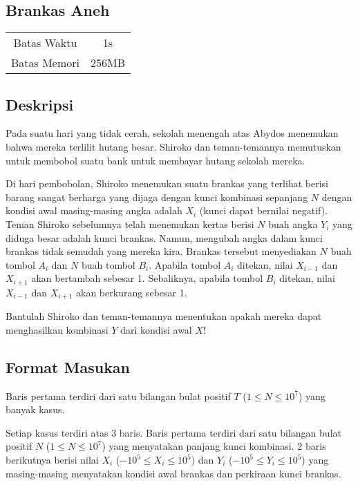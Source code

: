 \documentclass{article}
\begin{document}
\begin{center}

    
    \section*{Brankas Aneh} %

    \begin{tabular}{ | c c | }
        \hline
        Batas Waktu  & 1s \\    %
        Batas Memori & 256MB \\  %
        \hline
    \end{tabular}
\end{center}

\subsection*{Deskripsi}

Pada suatu hari yang tidak cerah, sekolah menengah atas Abydos menemukan bahwa mereka terlilit hutang besar. Shiroko dan teman-temannya memutuskan untuk membobol suatu bank untuk membayar hutang sekolah mereka.

Di hari pembobolan, Shiroko menemukan suatu brankas yang terlihat berisi barang sangat berharga yang dijaga dengan kunci kombinasi sepanjang $N$ dengan kondisi awal masing-masing angka adalah $X_i$ (kunci dapat bernilai negatif). Teman Shiroko sebelumnya telah menemukan kertas berisi $N$ buah angka $Y_i$ yang diduga besar adalah kunci brankas. Namun, mengubah angka dalam kunci brankas tidak semudah yang mereka kira. Brankas tersebut menyediakan $N$ buah tombol $A_i$ dan $N$ buah tombol $B_i$. Apabila tombol $A_i$ ditekan, nilai $X_{i-1}$ dan $X_{i+1}$ akan bertambah sebesar 1. Sebaliknya, apabila tombol $B_i$ ditekan, nilai $X_{i-1}$ dan $X_{i+1}$ akan berkurang sebesar 1.

Bantulah Shiroko dan teman-temannya menentukan apakah mereka dapat menghasilkan kombinasi $Y$ dari kondisi awal $X$!

\subsection*{Format Masukan}

Baris pertama terdiri dari satu bilangan bulat positif $T$ ($1 \leq N \leq 10^{7}$)  yang banyak kasus.

Setiap kasus terdiri atas 3 baris. Baris pertama terdiri dari satu bilangan bulat positif $N$ ($1 \leq N \leq 10^{7}$)  yang menyatakan panjang kunci kombinasi.
$2$ baris berikutnya berisi nilai $X_i$ ($-10^{5} \leq X_i \leq 10^{5}$) dan $Y_i$ ($-10^{5} \leq Y_i \leq 10^{5}$) yang masing-masing menyatakan kondisi awal brankas dan perkiraan kunci brankas.
\end{document}
